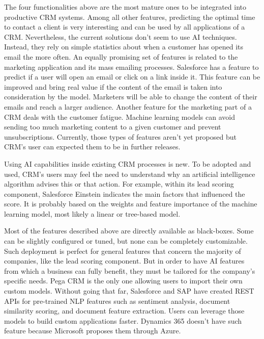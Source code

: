 The four functionalities above are the most mature ones to be integrated into productive CRM systems. Among all other features, predicting the optimal time to contact a client is very interesting and can be used by all applications of a CRM. Nevertheless, the current solutions don't seem to use AI techniques. Instead, they rely on simple statistics about when a customer has opened its email the more often. An equally promising set of features is related to the marketing application and its mass emailing processes. Salesforce has a feature to predict if a user will open an email or click on a link inside it. This feature can be improved and bring real value if the content of the email is taken into consideration by the model. Marketers will be able to change the content of their emails and reach a larger audience. Another feature for the marketing part of a CRM deals with the customer fatigue. Machine learning models can avoid sending too much marketing content to a given customer and prevent unsubscriptions. Currently, those types of features aren't yet proposed but CRM's user can expected them to be in further releases.

Using AI capabilities inside existing CRM processes is new. To be adopted and used, CRM's users may feel the need to understand why an artificial intelligence algorithm advises this or that action. For example, within its lead scoring component, Salesforce Einstein indicates the main factors that influenced the score. It is probably based on the weights and feature importance of the machine learning model, most likely a linear or tree-based model.

Most of the features described above are directly available as black-boxes. Some can be slightly configured or tuned, but none can be completely customizable. Such deployment is perfect for general features that concern the majority of companies, like the lead scoring component. But in order to have AI features from which a business can fully benefit, they must be tailored for the company's specific needs. Pega CRM is the only one allowing users to import their own custom models. Without going that far, Salesforce and SAP have created REST APIs for pre-trained NLP features such as sentiment analysis, document similarity scoring, and document feature extraction. Users can leverage those models to build custom applications faster. Dynamics 365 doesn't have such feature because Microsoft proposes them through Azure.


